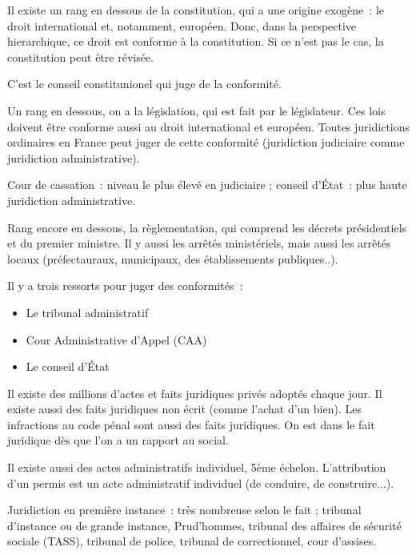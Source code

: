 Il existe un rang en dessous de la constitution, qui a une origine exogène~: le droit international et, notamment, européen. Donc, dans la perspective hierarchique, ce droit est conforme à la constitution. Si ce n'est pas le cas, la constitution peut être révisée.

C'est le conseil constitunionel qui juge de la conformité.\newline

Un rang en dessous, on a la législation, qui est fait par le législateur. Ces lois doivent être conforme aussi au droit international et européen. Toutes juridictions ordinaires en France peut juger de cette conformité (juridiction judiciaire comme juridiction administrative).\newline

Cour de cassation~: niveau le plus élevé en judiciaire ; conseil d'État~: plus haute juridiction administrative. 

Rang encore en dessous, la règlementation, qui comprend les décrets présidentiels et du premier ministre. Il y aussi les arrêtés ministériels, mais aussi les arrêtés locaux (préfectauraux, municipaux, des établissements publiques..).\newline

Il y a trois ressorts pour juger des conformités~:
\begin{itemize}
\item Le tribunal administratif
\item Cour Administrative d'Appel (CAA)
\item Le conseil d'État
\end{itemize}

Il existe des millions d'actes et faits juridiques privés adoptés chaque jour. Il existe aussi des faits juridiques non écrit (comme l'achat d'un bien). Les infractions au code pénal sont aussi des faits juridiques. On est dans le fait juridique dès que l'on a un rapport au social. \newline

Il existe aussi des actes administratifs individuel, 5ème échelon. L'attribution d'un permis est un acte administratif individuel (de conduire, de construire...). \newline

Juridiction en première instance~: très nombreuse selon le fait ; tribunal d'instance ou de grande instance, Prud'hommes, tribunal des affaires de sécurité sociale (TASS), tribunal de police, tribunal de correctionnel, cour d'assises.

